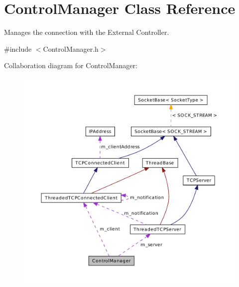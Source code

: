 \hypertarget{class_control_manager}{\section{Control\-Manager Class Reference}
\label{class_control_manager}
}


Manages the connection with the External Controller.  




{\ttfamily \#include $<$Control\-Manager.\-h$>$}



Collaboration diagram for Control\-Manager\-:\nopagebreak
\begin{figure}[H]
\begin{center}
\leavevmode
\includegraphics[width=350pt]{class_control_manager__coll__graph}
\end{center}
\end{figure}
